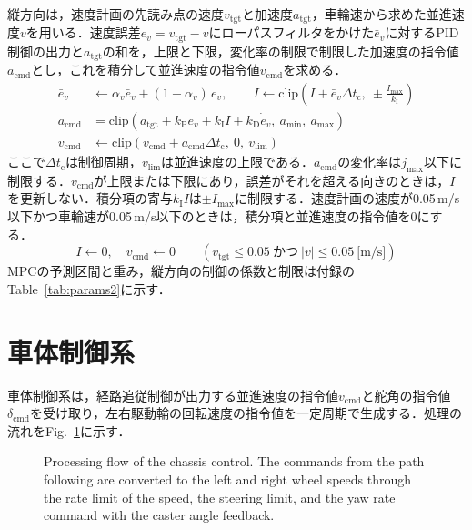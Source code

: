 縦方向は，速度計画の先読み点の速度$v_{\mathrm{tgt}}$と加速度$a_{\mathrm{tgt}}$，車輪速から求めた並進速度$v$を用いる．速度誤差$e_v=v_{\mathrm{tgt}}-v$にローパスフィルタをかけた$\bar{e}_v$に対するPID制御の出力と$a_{\mathrm{tgt}}$の和を，上限と下限，変化率の制限で制限した加速度の指令値$a_{\mathrm{cmd}}$とし，これを積分して並進速度の指令値$v_{\mathrm{cmd}}$を求める．
\begin{align}
  \bar{e}_v &\leftarrow \alpha_v \bar{e}_v + (1-\alpha_v)\, e_v,\qquad
  I \leftarrow \mathrm{clip}\left(I + \bar{e}_v \Delta t_{\mathrm{c}},\ \pm \frac{I_{\max}}{k_{\mathrm{I}}}\right) \label{eq:pid_i}\\
  a_{\mathrm{cmd}} &= \mathrm{clip}\left(a_{\mathrm{tgt}} + k_{\mathrm{P}}\bar{e}_v + k_{\mathrm{I}} I + k_{\mathrm{D}}\dot{\bar{e}}_v,\ a_{\min},\ a_{\max}\right) \label{eq:pid_a}\\
  v_{\mathrm{cmd}} &\leftarrow \mathrm{clip}\left(v_{\mathrm{cmd}} + a_{\mathrm{cmd}}\Delta t_{\mathrm{c}},\ 0,\ v_{\mathrm{lim}}\right) \label{eq:pid_v}
\end{align}
ここで$\Delta t_{\mathrm{c}}$は制御周期，$v_{\mathrm{lim}}$は並進速度の上限である．$a_{\mathrm{cmd}}$の変化率は$j_{\max}$以下に制限する．$v_{\mathrm{cmd}}$が上限または下限にあり，誤差がそれを超える向きのときは，$I$を更新しない．積分項の寄与$k_{\mathrm{I}}I$は$\pm I_{\max}$に制限する．速度計画の速度が0.05\,m/s以下かつ車輪速が0.05\,m/s以下のときは，積分項と並進速度の指令値を0にする．
\begin{equation}
  I \leftarrow 0,\quad v_{\mathrm{cmd}} \leftarrow 0 \qquad (v_{\mathrm{tgt}} \le 0.05\ \text{かつ}\ |v| \le 0.05\ \text{[m/s]})
  \label{eq:pidreset}
\end{equation}
MPCの予測区間と重み，縦方向の制御の係数と制限は付録のTable~\ref{tab:params2}に示す．

\section{車体制御系}
\label{sec:chassis}
車体制御系は，経路追従制御が出力する並進速度の指令値$v_{\mathrm{cmd}}$と舵角の指令値$\delta_{\mathrm{cmd}}$を受け取り，左右駆動輪の回転速度の指令値を一定周期で生成する．処理の流れをFig.~\ref{fig:chassis}に示す．

\begin{figure}[H]
  \centering
  
  \caption[Processing flow of the chassis control.]{Processing flow of the chassis control. The commands from the path following are converted to the left and right wheel speeds through the rate limit of the speed, the steering limit, and the yaw rate command with the caster angle feedback.}
  \label{fig:chassis}
\end{figure}

